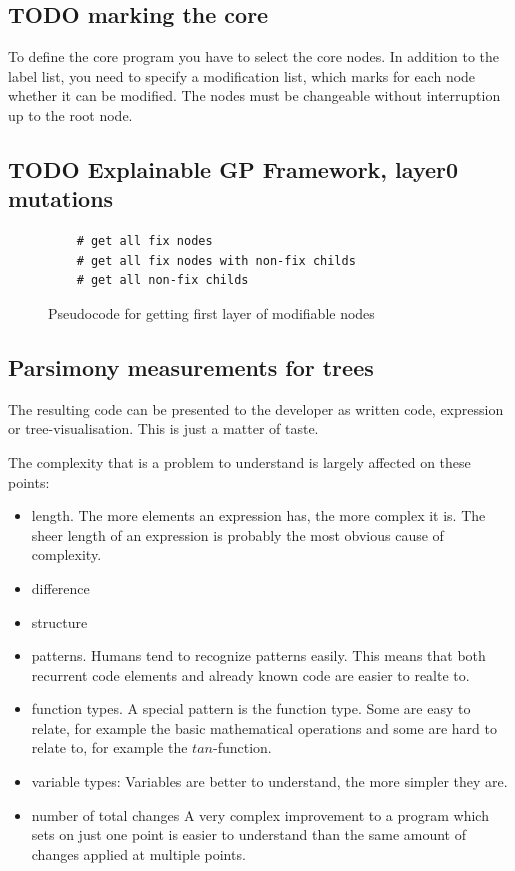\subsection{TODO marking the core}

To define the core program you have to select the core nodes. In addition to the label list, you need to specify a modification list, which marks for each node whether it can be modified. The nodes must be changeable without interruption up to the root node.

\subsection{TODO Explainable GP Framework, layer0 mutations}

\begin{figure}
    \centering
    
    \begin{lstlisting}
    # get all fix nodes
    # get all fix nodes with non-fix childs
    # get all non-fix childs
    \end{lstlisting}
    \caption{Pseudocode for getting first layer of modifiable nodes}
    \label{fig:my_label}
\end{figure}

\subsection{Parsimony measurements for trees}

The resulting code can be presented to the developer as written code, expression or tree-visualisation. This is just a matter of taste.

The complexity that is a problem to understand is largely affected on these points:
\begin{itemize}
    \item length.
    The more elements an expression has, the more complex it is. The sheer length of an expression is probably the most obvious cause of complexity.
    \item difference
    \item structure
    \item patterns.
    Humans tend to recognize patterns easily. This means that both recurrent code elements and already known code are easier to realte to.
    \item function types.
    A special pattern is the function type. Some are easy to relate, for example the basic mathematical operations and some are hard to relate to, for example the $tan$-function.
    \item variable types:
    Variables are better to understand, the more simpler they are. 
    \item number of total changes
    A very complex improvement to a program which sets on just one point is easier to understand than the same amount of changes applied at multiple points.
\end{itemize}

